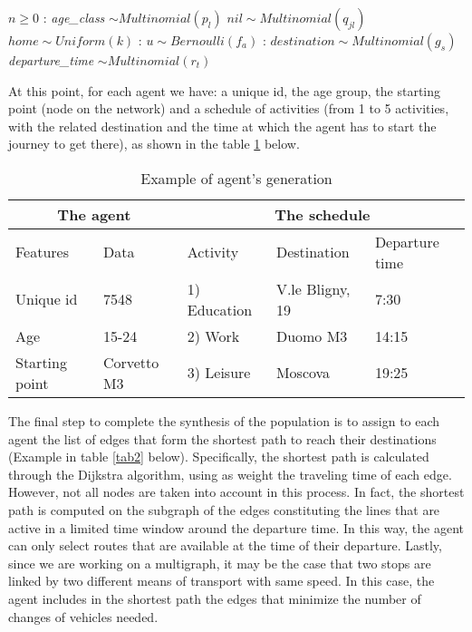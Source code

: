 \begin{algorithm}
\caption{Agents' generation following Strategy 1}\label{alg1}
\begin{algorithmic}
\Require $n \geq 0$
:
\State \textit{age\_class} $\sim Multinomial(p_l)$ 
\State $nil \sim Multinomial(q_{jl})$ 
\State $home \sim Uniform(k)$ 
:
\State $ u \sim Bernoulli(f_a)$ 
:
    \State $destination \sim Multinomial(g_s)$ \\ 
    \State \textit{departure\_time} $\sim Multinomial(r_t)$ \\
\EndIf
\EndFor
\EndFor
\end{algorithmic}
\end{algorithm}

At this point, for each agent we have: a unique id, the age group, the starting point (node on the network) and a schedule of activities (from 1 to 5 activities, with the related destination and the time at which the agent has to start the journey to get there), as shown in the table \ref{tab1} below. 

\begin{table}[h]
\centering
\caption{Example of agent's generation}\label{tab1}%
\begin{tabular}{ll|lll}
\multicolumn{2}{c|}{The agent} & \multicolumn{3}{c}{The schedule} \\ 
\toprule
Features      & Data      & Activity & Destination & Departure time \\ 
\midrule
Unique id & 7548 & 1) Education & V.le Bligny, 19 & 7:30\\
Age & 15-24  &  2) Work	& Duomo M3 & 14:15\\
Starting point & Corvetto M3 & 3) Leisure & Moscova & 19:25\\
\bottomrule
\end{tabular}
\end{table}

The final step to complete the synthesis of the population is to assign to each agent the list of edges that form the shortest path to reach their destinations (Example in table \ref{tab2} below). Specifically, the shortest path is calculated through the Dijkstra algorithm, using as weight the traveling time of each edge. However, not all nodes are taken into account in this process. In fact, the shortest path is computed on the subgraph of the edges constituting the lines that are active in a limited time window around the departure time. In this way, the agent can only select routes that are available at the time of their departure. Lastly, since we are working on a multigraph, it may be the case that two stops are linked by two different means of transport with same speed. In this case, the agent includes in the shortest path the edges that minimize the number of changes of vehicles needed.


